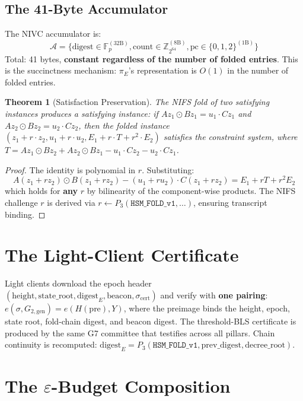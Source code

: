 \documentclass[11pt,a4paper]{article}
\newtheorem{theorem}{Theorem}
\begin{document}
\subsection{The 41-Byte Accumulator}

The NIVC accumulator is:
\[
\mathcal{A} = \{\text{digest} \in \mathbb{F}_p^{(32\text{B})},
\text{count} \in \mathbb{Z}_{2^{64}}^{(8\text{B})},
\text{pc} \in \{0,1,2\}^{(1\text{B})}\}
\]
Total: 41 bytes, \textbf{constant regardless of the number of folded
entries}. This is the succinctness mechanism: $\pi_E$'s representation
is $O(1)$ in the number of folded entries.

\begin{theorem}[Satisfaction Preservation]
The NIFS fold of two satisfying instances produces a satisfying
instance: if $Az_1 \odot Bz_1 = u_1 \cdot Cz_1$ and
 $Az_2 \odot Bz_2 = u_2 \cdot Cz_2$, then the folded instance
 $(z_1 + r \cdot z_2, u_1 + r \cdot u_2, E_1 + r \cdot T + r^2 \cdot E_2)$ satisfies the constraint system, where
 $T = Az_1 \odot Bz_2 + Az_2 \odot Bz_1 - u_1 \cdot Cz_2 - u_2 \cdot Cz_1$.
\end{theorem}
\begin{proof}
The identity is polynomial in $r$. Substituting:
\[
A(z_1 + rz_2) \odot B(z_1 + rz_2) - (u_1 + ru_2) \cdot C(z_1 + rz_2)
= E_1 + rT + r^2E_2
\]
which holds for \textbf{any} $r$ by bilinearity of the component-wise
products. The NIFS challenge $r$ is derived via
 $r \gets P_3(\texttt{HSM\_FOLD\_v1}, \ldots)$, ensuring transcript
binding.
\end{proof}

\section{The Light-Client Certificate}

Light clients download the epoch header
 $(\text{height}, \text{state\_root}, \text{digest}_E,
\text{beacon}, \sigma_{\text{cert}})$ and verify with
\textbf{one pairing}:
 $e(\sigma, G_{2,\mathrm{gen}}) = e(H(\text{pre}), Y)$, where the
preimage binds the height, epoch, state root, fold-chain digest, and
beacon digest. The threshold-BLS certificate is produced by the same
G7 committee that testifies across all pillars. Chain continuity is
recomputed: $\text{digest}_E = P_3(\texttt{HSM\_FOLD\_v1},
\text{prev\_digest}, \text{decree\_root})$.

\section{The $\varepsilon$-Budget Composition}
\end{document}
